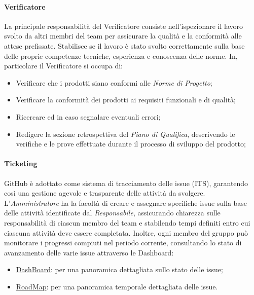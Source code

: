 \paragraph{Verificatore}\label{verificatore} La principale responsabilità del Verificatore consiste nell'ispezionare il lavoro svolto da altri membri del team per assicurare la qualità e la conformità alle attese prefissate.
Stabilisce se il lavoro è stato svolto correttamente sulla base delle proprie competenze tecniche, esperienza e conoscenza delle norme. In, particolare il Verificatore si occupa di:
\begin{itemize}
    \item Verificare che i prodotti siano conformi alle \textit{Norme di Progetto};
    \item Verificare la conformità dei prodotti ai requisiti funzionali e di qualità;
    \item Ricercare ed in caso segnalare eventuali errori;
    \item Redigere la sezione retrospettiva del \textit{Piano di Qualifica}, descrivendo le verifiche e le prove effettuate durante il processo di sviluppo del prodotto;
\end{itemize}

\hypertarget{par:ticketing}{\paragraph{Ticketing}}
GitHub è adottato come sistema di tracciamento delle issue (ITS), garantendo così una gestione agevole e trasparente delle attività da svolgere. \\
L'\textit{Amministratore} ha la facoltà di creare e assegnare specifiche issue sulla base delle attività identificate dal \textit{Responsabile}, assicurando chiarezza sulle responsabilità di ciascun membro del team e stabilendo tempi definiti entro cui ciascuna attività deve essere completata. Inoltre, ogni membro del gruppo può monitorare i progressi compiuti nel periodo corrente, consultando lo stato di avanzamento delle varie issue attraverso le Dashboard:
\begin{itemize}
    \item \href{https://github.com/orgs/ByteOps-swe/projects/1}{DashBoard}: per una panoramica dettagliata sullo stato delle issue;
    \item \href{https://github.com/orgs/ByteOps-swe/projects/3}{RoadMap}: per una panoramica temporale dettagliata delle issue.
\end{itemize}

